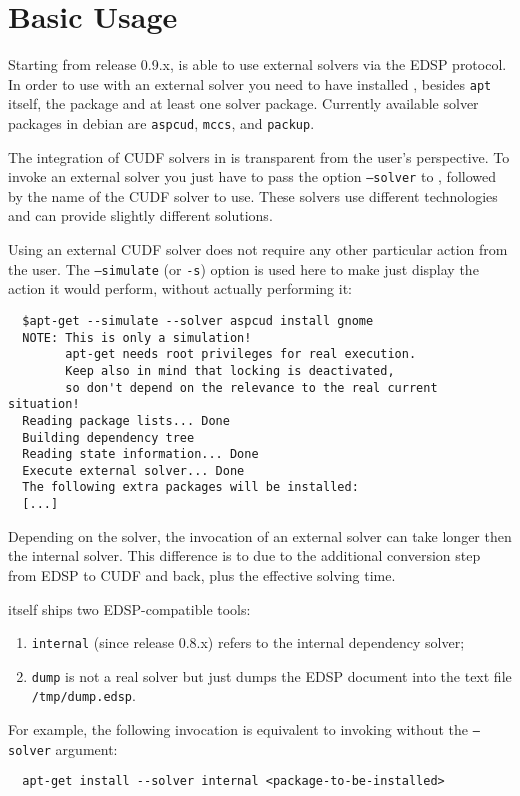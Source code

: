 \section{Basic Usage}

Starting from release 0.9.x, \aptget{} is able to use external solvers
via the EDSP protocol. In order to use \aptget{} with an external
solver you need to have installed , besides \texttt{apt} itself, the
package \aptcudf{} and at least one solver package. Currently
available solver packages in debian are \texttt{aspcud},
\texttt{mccs}, and \texttt{packup}.

The integration of CUDF solvers in \aptget{} is transparent from the
user's perspective. To invoke an external solver you just have to
pass the option \texttt{--solver} to \aptget{}, followed by the name of the
CUDF solver to use.
These solvers use different technologies and can provide
slightly different solutions.

Using an external CUDF solver does not require any other particular
action from the user. The \texttt{--simulate} (or \texttt{-s}) option is
used here to make \aptget{} just display the action it would perform, without
actually performing it:

\begin{verbatim}
  $apt-get --simulate --solver aspcud install gnome
  NOTE: This is only a simulation!
        apt-get needs root privileges for real execution.
        Keep also in mind that locking is deactivated,
        so don't depend on the relevance to the real current situation!
  Reading package lists... Done
  Building dependency tree       
  Reading state information... Done
  Execute external solver... Done
  The following extra packages will be installed:
  [...]
\end{verbatim}

Depending on the solver, the invocation of an external solver can take
longer then the \aptget{} internal solver. This difference is to due
to the additional conversion step from EDSP to CUDF and back, plus
the effective solving time.

\aptget{} itself ships two EDSP-compatible tools:
\begin{enumerate}
\item \texttt{internal} (since release 0.8.x) refers to the internal
  \aptget{} dependency solver;
\item \texttt{dump} is not a real solver but just dumps the EDSP document
  into the text file \texttt{/tmp/dump.edsp}.
\end{enumerate}

For example, the following invocation is equivalent to invoking
\aptget{} without the \texttt{--solver} argument:

\begin{verbatim}
  apt-get install --solver internal <package-to-be-installed>
\end{verbatim}
